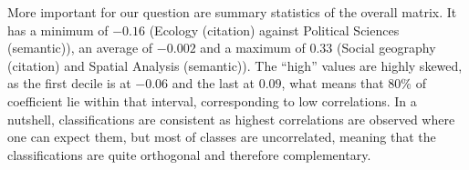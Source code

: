 More important for our question are summary statistics of the overall matrix. It has a minimum of $-0.16$ (Ecology (citation) against Political Sciences (semantic)), an average of $-0.002$ and a maximum of $0.33$ (Social geography (citation) and Spatial Analysis (semantic)). The ``high'' values are highly skewed, as the first decile is at $-0.06$ and the last at $0.09$, what means that 80\% of coefficient lie within that interval, corresponding to low correlations. In a nutshell, classifications are consistent as highest correlations are observed where one can expect them, but most of classes are uncorrelated, meaning that the classifications are quite orthogonal and therefore complementary.






